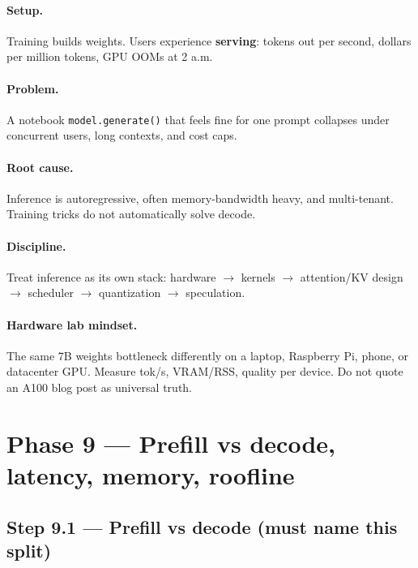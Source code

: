 \documentclass[11pt,a4paper]{article}
\begin{document}
\paragraph{Setup.}

Training builds weights. Users experience \textbf{serving}: tokens out per second, dollars per million tokens, GPU OOMs at 2 a.m.


\paragraph{Problem.}

A notebook \texttt{model.generate()} that feels fine for one prompt collapses under concurrent users, long contexts, and cost caps.


\paragraph{Root cause.}

Inference is autoregressive, often memory-bandwidth heavy, and multi-tenant. Training tricks do not automatically solve decode.


\paragraph{Discipline.}

Treat inference as its own stack: hardware $\rightarrow$ kernels $\rightarrow$ attention/KV design $\rightarrow$ scheduler $\rightarrow$ quantization $\rightarrow$ speculation.


\paragraph{Hardware lab mindset.}

The same 7B weights bottleneck differently on a laptop, Raspberry Pi, phone, or datacenter GPU. Measure tok/s, VRAM/RSS, quality per device. Do not quote an A100 blog post as universal truth.


\bigskip


\clearpage
\section{Phase 9 --- Prefill vs decode, latency, memory, roofline}


\subsection{Step 9.1 --- Prefill vs decode (must name this split)}
\end{document}
